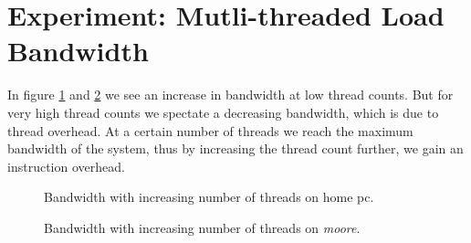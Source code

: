 \documentclass[DIV=12,oneside,a4paper]{scrartcl}
\begin{document}
\section{Experiment: Mutli-threaded Load Bandwidth}

In figure \ref{threads_local} and \ref{threads_remote} we see 
an increase in bandwidth at low thread counts. But for very high
thread counts we spectate a decreasing bandwidth, which is due to
thread overhead. At a certain number of threads we reach the 
maximum bandwidth of the system, thus by increasing the 
thread count further, we gain an instruction overhead.

\begin{figure}
	
	\label{threads_local}
	\caption{Bandwidth with increasing number of threads on home pc.}
\end{figure}

\begin{figure}
	
	\label{threads_remote}
	\caption{Bandwidth with increasing number of threads on \emph{moore}.}

\end{figure}
\end{document}
